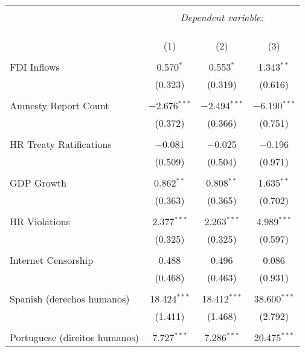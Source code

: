 
\begin{table}[!htbp] \centering 
  \caption{} 
  \label{} 
\begin{tabular}{@{\extracolsep{5pt}}lccc} 
\\[-1.8ex]\hline 
\hline \\[-1.8ex] 
 & \multicolumn{3}{c}{\textit{Dependent variable:}} \\ 
\cline{2-4} 
\\[-1.8ex] & \multicolumn{3}{c}{ } \\ 
\\[-1.8ex] & (1) & (2) & (3)\\ 
\hline \\[-1.8ex] 
 FDI Inflows & 0.570$^{*}$ & 0.553$^{*}$ & 1.343$^{**}$ \\ 
  & (0.323) & (0.319) & (0.616) \\ 
  & & & \\ 
 Amnesty Report Count & $-$2.676$^{***}$ & $-$2.494$^{***}$ & $-$6.190$^{***}$ \\ 
  & (0.372) & (0.366) & (0.751) \\ 
  & & & \\ 
 HR Treaty Ratifications & $-$0.081 & $-$0.025 & $-$0.196 \\ 
  & (0.509) & (0.504) & (0.971) \\ 
  & & & \\ 
 GDP Growth & 0.862$^{**}$ & 0.808$^{**}$ & 1.635$^{**}$ \\ 
  & (0.363) & (0.365) & (0.702) \\ 
  & & & \\ 
 HR Violations & 2.377$^{***}$ & 2.263$^{***}$ & 4.989$^{***}$ \\ 
  & (0.325) & (0.325) & (0.597) \\ 
  & & & \\ 
 Internet Censorship & 0.488 & 0.496 & 0.086 \\ 
  & (0.468) & (0.463) & (0.931) \\ 
  & & & \\ 
 Spanish (derechos humanos) & 18.424$^{***}$ & 18.412$^{***}$ & 38.600$^{***}$ \\ 
  & (1.411) & (1.468) & (2.792) \\ 
  & & & \\ 
 Portuguese (direitos humanos) & 7.727$^{***}$ & 7.286$^{***}$ & 20.475$^{***}$ \\ 

\end{tabular}
\end{table}
